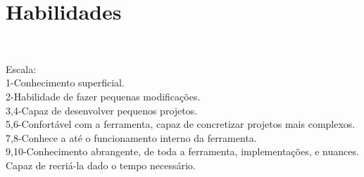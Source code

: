 \documentclass[A4]{deedy-resume} %
\newcommand\resume[2]{%
  \ifnum#1>#2
    $#1 > #2$
  \else
    \ifnum#1<0
      $#1 < 0$
    \else
      \ifnum#2<0
        $#2 < 0$
      \else
        \tikz{%
        \ifx#20
        \else
          \foreach \i in {1,...,#2} {
            \filldraw[black!20] (\i ex,0) circle (0.4ex);
          };
        \fi
        \ifx#10
        \else
          \foreach \i in {1,...,#1} {
            \filldraw[black] (\i ex,0) circle (0.4ex);
          };
        \fi
        }
      \fi
    \fi
  \fi
}
\begin{document}
\begin{minipage}[t]{0.33\textwidth}
\section{Habilidades}


\\

\vspace*{0.2cm}

\vspace*{0.2cm}


\vspace*{0.3cm}
Escala:\\
\scriptsize 1-Conhecimento superficial.\\
2-Habilidade de fazer pequenas modificações.\\
3,4-Capaz de desenvolver pequenos projetos.\\
5,6-Confortável com a ferramenta, capaz de concretizar projetos mais complexos.\\
7,8-Conhece a até o funcionamento interno da ferramenta. \\
9,10-Conhecimento abrangente, de toda a ferramenta, implementações, e nuances. Capaz de recriá-la dado o tempo necessário.


\end{minipage}
\end{document}

